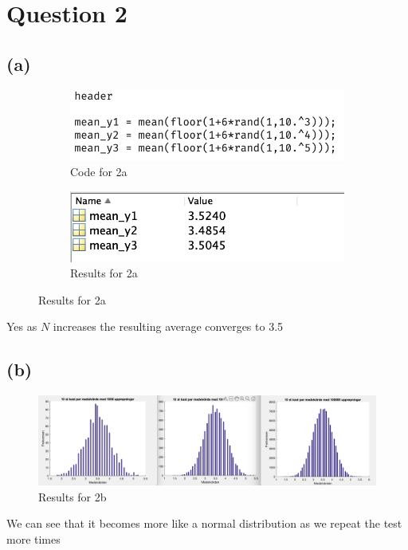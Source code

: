 \documentclass{article}
\begin{document}
\newpage
\section{Question 2}
\subsection{(a)}
\begin{figure}[H]
    \begin{subfigure}[h]{0.45\linewidth}
        \includegraphics[width=\linewidth]{imgs/q2a_code.png}
        \caption{Code for 2a}
    \end{subfigure}
    \hfill
    \begin{subfigure}[h]{0.45\linewidth}
        \includegraphics[width=\linewidth]{imgs/q2a_result.png}
        \caption{Results for 2a}
    \end{subfigure}
\end{figure}
Yes as \( N \) increases the resulting average converges to 3.5

\subsection{(b)}

\begin{figure}[H]
    \centering
    \includegraphics[width=\linewidth]{imgs/q2b.png}
    \caption{Results for 2b}
\end{figure}
We can see that it becomes more like a normal distribution as we repeat the test more times
\end{document}
